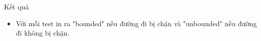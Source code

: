 Kết quả
\begin{itemize}
	\item     Với mỗi test in ra "bounded" nếu đường đi bị chặn và "unbounded" nếu đường đi không bị chặn.   
\end{itemize}